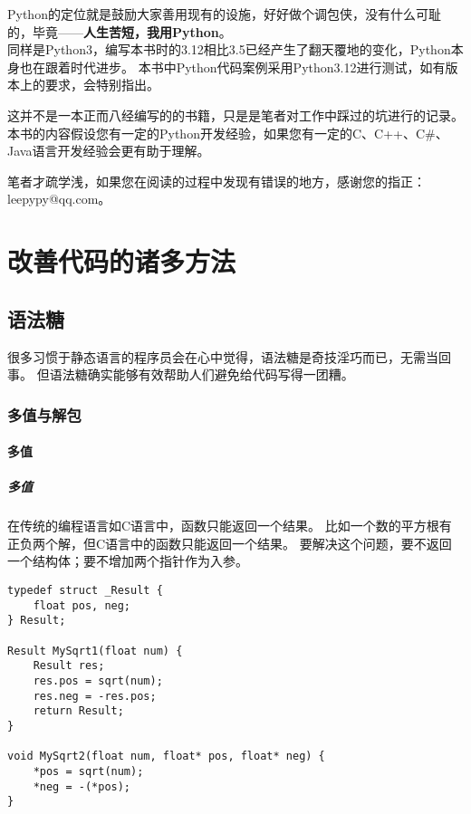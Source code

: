 \documentclass{ctexbook}
\begin{document}
Python的定位就是鼓励大家善用现有的设施，好好做个调包侠，没有什么可耻的，毕竟——\textbf{人生苦短，我用Python}。\\[0.1in]

同样是Python3，编写本书时的3.12相比3.5已经产生了翻天覆地的变化，Python本身也在跟着时代进步。
本书中Python代码案例采用Python3.12进行测试，如有版本上的要求，会特别指出。

这并不是一本正而八经编写的的书籍，只是是笔者对工作中踩过的坑进行的记录。
本书的内容假设您有一定的Python开发经验，如果您有一定的C、C++、C\#、Java语言开发经验会更有助于理解。

笔者才疏学浅，如果您在阅读的过程中发现有错误的地方，感谢您的指正：leepypy@qq.com。

\tableofcontents

\part{改善代码的诸多方法}

\chapter{语法糖}
很多习惯于静态语言的程序员会在心中觉得，语法糖是奇技淫巧而已，无需当回事。
但语法糖确实能够有效帮助人们避免给代码写得一团糟。

\section{多值与解包}

\subsection{多值}

\subsubsection{多值}

在传统的编程语言如C语言中，函数只能返回一个结果。
比如一个数的平方根有正负两个解，但C语言中的函数只能返回一个结果。
要解决这个问题，要不返回一个结构体；要不增加两个指针作为入参。

\begin{verbatim}
typedef struct _Result {
    float pos, neg;
} Result;

Result MySqrt1(float num) {
    Result res;
    res.pos = sqrt(num);
    res.neg = -res.pos;
    return Result;
}

void MySqrt2(float num, float* pos, float* neg) {
    *pos = sqrt(num);
    *neg = -(*pos);
}
\end{verbatim}
\end{document}
